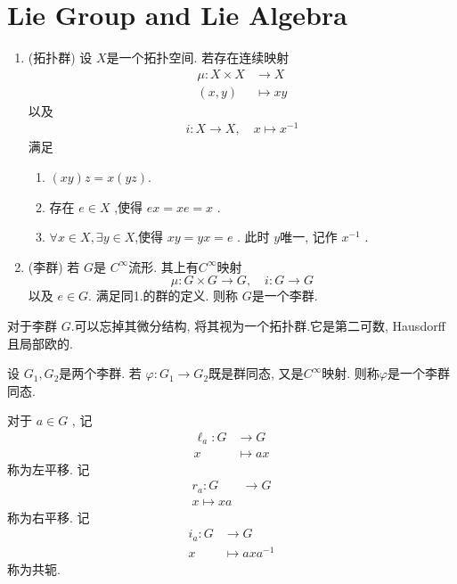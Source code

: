 \documentclass[../main.tex]{subfiles}
\begin{document}
\chapter{Lie Group and Lie Algebra}

\begin{definition}{}{}
    \begin{enumerate}
        \item (拓扑群)  设 \(  X  \)是一个拓扑空间.  若存在连续映射 \[
        \begin{aligned}
        \mu : X\times X&\to X\\ 
         \left( x,y \right)& \mapsto  xy  
        \end{aligned}
        \] 以及 \[
        \begin{aligned}
        i: X\to X,\quad x\mapsto x^{-1}  
        \end{aligned}
        \]满足
        \begin{enumerate}
            \item  \(  \left( xy \right)z= x\left( yz \right)    \).
            \item 存在 \(  e \in X  \) ,使得 \(  ex= xe= x    \) .
            \item \(  \forall x\in X, \exists y \in X  \),使得 \(  xy= yx= e  \) . 此时 \(  y  \)唯一, 记作 \(  x^{-1}   \) .   
        \end{enumerate}
    
    \item (李群) 若 \(  G  \)是 \(  C^{\infty}  \)流形. 其上有\(  C^{\infty}  \)映射 \[
    \mu : G\times G\to G,\quad i:G\to G
    \]   以及 \(  e \in G  \). 满足同1.的群的定义. 则称 \(  G  \)是一个李群.   
    \end{enumerate}
    
\end{definition}
\begin{remark}
    对于李群 \(G\).可以忘掉其微分结构, 将其视为一个拓扑群.它是第二可数,  Hausdorff且局部欧的. 
\end{remark}

\begin{definition}{}{}
    设 \(  G_1,G_2  \)是两个李群. 若 \(   \varphi :G_1\to G_2  \)既是群同态, 又是\(  C^{\infty}  \)映射. 则称\(   \varphi   \)是一个李群同态.     
\end{definition}
\begin{definition}{}{}
    对于 \(  a \in G  \) , 记   \[
    \begin{aligned}
     \ell_{a}: G&\to G\\ 
      x & \mapsto  ax
    \end{aligned}
    \]称为左平移. 记 \[
    \begin{aligned}
    r_{a}: G&\to G\\ 
     x\mapsto xa 
    \end{aligned}
    \]称为右平移. 
    记 \[
    \begin{aligned}
    i_{a}: G&\to G\\ 
     x&\mapsto  axa^{-1}  
    \end{aligned}
    \]称为共轭. 
\end{definition}
\end{document}
